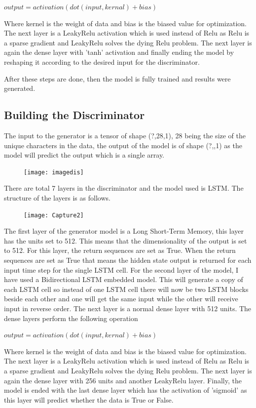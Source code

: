 \documentclass[oneside,12pt]{Classes/RoboticsLaTeX}
\begin{document}
$output = activation(dot(input,kernal)+ bias)$

Where kernel is the weight of data and bias is the biased value for optimization.
The next layer is a LeakyRelu activation which is used instead of Relu as Relu is a sparse gradient and LeakyRelu solves the dying Relu problem.
The next layer is again the dense layer with 'tanh' activation and finally ending the model by reshaping it according to the desired input for the discriminator.

After these steps are done, then the model is fully trained and results were generated.

\subsection{Building the Discriminator}

The input to the generator is a tensor of shape (?,28,1), 28 being the size of the unique characters in the data, the output of the model is of shape (?,,1) as the model will predict the output which is a single array.

\begin{figure}[H]
  \texttt{[image: imagedis]}
  \centering
\end{figure}

There are total 7 layers in the discriminator and the model used is LSTM. The structure of the layers is as follows.

\begin{figure}[H]
  \texttt{[image: Capture2]}
  \centering
\end{figure}

The first layer of the generator model is a Long Short-Term Memory, this layer has the units set to 512. This means that the dimensionality of the output is set to 512. For this layer, the return sequences are set as True. When the return sequences are set as True that means the hidden state output is returned for each input time step for the single LSTM cell.
For the second layer of the model, I have used a Bidirectional LSTM embedded model. This will generate a copy of each LSTM cell so instead of one LSTM cell there will now be two LSTM blocks beside each other and one will get the same input while the other will receive input in reverse order.
The next layer is a normal dense layer with 512 units. The dense layers perform the following operation 


$output = activation(dot(input,kernal)+ bias)$

Where kernel is the weight of data and bias is the biased value for optimization.
The next layer is a LeakyRelu activation which is used instead of Relu as Relu is a sparse gradient and LeakyRelu solves the dying Relu problem.
The next layer is again the dense layer with 256 units and another LeakyRelu layer.
Finally, the model is ended with the last dense layer which has the activation of 'sigmoid' as this layer will predict whether the data is True or False.
\end{document}
